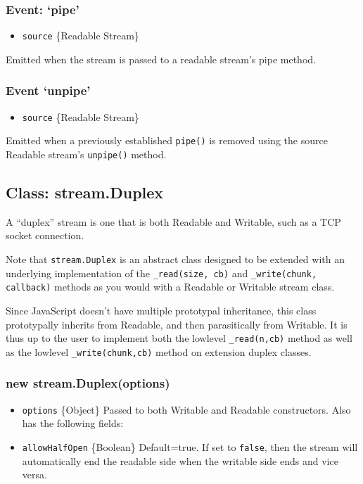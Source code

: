 \subsubsection{Event: `pipe'}

\begin{itemize}
\item
  \texttt{source} \{Readable Stream\}
\end{itemize}

Emitted when the stream is passed to a readable stream's pipe method.

\subsubsection{Event `unpipe'}

\begin{itemize}
\item
  \texttt{source} \{Readable Stream\}
\end{itemize}

Emitted when a previously established \texttt{pipe()} is removed using
the source Readable stream's \texttt{unpipe()} method.

\subsection{Class: stream.Duplex}

A ``duplex'' stream is one that is both Readable and Writable, such as a
TCP socket connection.

Note that \texttt{stream.Duplex} is an abstract class designed to be
extended with an underlying implementation of the
\texttt{\_read(size, cb)} and \texttt{\_write(chunk, callback)} methods
as you would with a Readable or Writable stream class.

Since JavaScript doesn't have multiple prototypal inheritance, this
class prototypally inherits from Readable, and then parasitically from
Writable. It is thus up to the user to implement both the lowlevel
\texttt{\_read(n,cb)} method as well as the lowlevel
\texttt{\_write(chunk,cb)} method on extension duplex classes.

\subsubsection{new stream.Duplex(options)}

\begin{itemize}
\item
  \texttt{options} \{Object\} Passed to both Writable and Readable
  constructors. Also has the following fields:
\item
  \texttt{allowHalfOpen} \{Boolean\} Default=true. If set to
  \texttt{false}, then the stream will automatically end the readable
  side when the writable side ends and vice versa.
\end{itemize}

